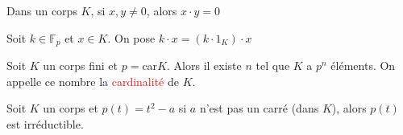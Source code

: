         \begin{lemme}
            Dans un corps $K$, si $x, y \neq 0$, alors $x\cdot y = 0$
        \end{lemme}
    \begin{definition}
        Soit $k \in \mathbb{F}_p$ et $x \in K$. On pose $k \cdot x = (k\cdot 1_K)\cdot x$
    \end{definition}
    \begin{theoreme}
        Soit $K$ un corps fini et $p = $car$K$. Alors il existe $n$ tel que $K$ a $p^n$ éléments. On appelle ce nombre la \textcolor{red}{cardinalité} de $K$. 
    \end{theoreme}
        \begin{proposition}
            Soit $K$ un corps et $p(t) = t^2 - a$ si $a$ n'est pas un carré (dans $K$), alors $p(t)$ est irréductible.
        \end{proposition}